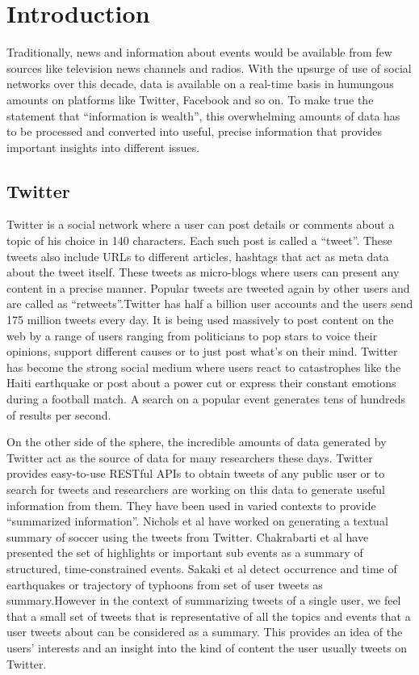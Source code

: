 \chapter{Introduction}
\label{chap-one}

Traditionally, news and information about events would be available from few sources like television news channels and radios. With the upsurge of use of social networks over this decade, data is available on a real-time basis in humungous amounts on platforms like Twitter, Facebook and so on. To make true the statement that “information is wealth”, this overwhelming amounts of data has to be processed and converted into useful, precise information that provides important insights into different issues.

\section{Twitter}
Twitter is a social network where a user can post details or comments about a topic of his choice in 140 characters. Each such post is called a “tweet”. These tweets also include URLs to different articles, hashtags that act as meta data about the tweet itself.  These tweets as micro-blogs where users can present any content in a precise manner. Popular tweets are tweeted again by other users and are called as “retweets”.Twitter has half a billion user accounts and the users send 175 million tweets every day. It is being used massively to post content on the web by a range of users ranging from politicians to pop stars to voice their opinions, support different causes or to just post what’s on their mind. Twitter has become the strong social medium where users react to catastrophes like the Haiti earthquake or post about a power cut or express their constant emotions during a football match. A search on a popular event generates tens of hundreds of results per second. 

On the other side of the sphere, the incredible amounts of data generated by Twitter act as the source of data for many researchers these days. Twitter provides easy-to-use RESTful APIs to obtain tweets of any public user or to search for tweets and researchers are working on this data to generate useful information from them. They have been used in varied contexts to provide “summarized information”. Nichols et al have worked on generating a textual summary of soccer using the tweets from Twitter. Chakrabarti et al have presented the set of highlights or important sub events as a summary of structured, time-constrained events. Sakaki et al detect occurrence and time of earthquakes or trajectory of typhoons from set of user tweets as summary.However in the context of summarizing tweets of a single user, we feel that a small set of tweets that is representative of all the topics and events that a user tweets about can be considered as a summary. This  provides an idea of the users’ interests and an insight into the kind of content the user usually tweets on Twitter.

